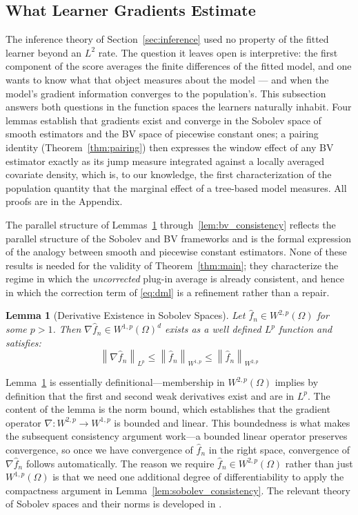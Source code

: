 \documentclass[12pt]{article}
\newtheorem{lemma}{Lemma}
\newcommand{\norm}[1]{\left\| #1 \right\|}
\newcommand{\Wonep}{W^{1,p}(\Omega)}
\newcommand{\Wtwop}{W^{2,p}(\Omega)}
\newcommand{\fn}{\hat{f}_n}
\begin{document}
	\subsection{What Learner Gradients Estimate}
	\label{sec:interpretation}
	
	The inference theory of Section~\ref{sec:inference} used no property of the fitted
	learner beyond an $L^2$ rate. The question it leaves open is interpretive: the
	first component of the score averages the finite differences of the fitted model,
	and one wants to know what that object measures about the model --- and when the
	model's gradient information converges to the population's. This subsection answers
	both questions in the function spaces the learners naturally inhabit. Four lemmas
	establish that gradients exist and converge in the Sobolev space of smooth
	estimators and the BV space of piecewise constant ones; a pairing identity
	(Theorem~\ref{thm:pairing}) then expresses the window effect of any BV estimator
	exactly as its jump measure integrated against a locally averaged covariate
	density, which is, to our knowledge, the first characterization of the population
	quantity that the marginal effect of a tree-based model measures. All proofs are in
	the Appendix.
	
	The parallel structure of Lemmas~\ref{lem:sobolev_existence}
	through~\ref{lem:bv_consistency} reflects the parallel structure of the Sobolev
	and BV frameworks and is the formal expression of the analogy between smooth and
	piecewise constant estimators. None of these results is needed for the validity of
	Theorem~\ref{thm:main}; they characterize the regime in which the \emph{uncorrected}
	plug-in average is already consistent, and hence in which the correction term of
	\eqref{eq:dml} is a refinement rather than a repair.
	
	\begin{lemma}[Derivative Existence in Sobolev Spaces]
		\label{lem:sobolev_existence}
		Let $\fn \in \Wtwop$ for some $p > 1$. Then $\nabla \fn \in W^{1,p}(\Omega)^d$
		exists as a well defined $L^p$ function and satisfies:
		\begin{equation}
			\norm{\nabla \fn}_{L^p} \leq \norm{\fn}_{W^{1,p}} \leq \norm{\fn}_{W^{2,p}}
		\end{equation}
	\end{lemma}
	
	Lemma~\ref{lem:sobolev_existence} is essentially definitional---membership in
	$\Wtwop$ implies by definition that the first and second weak derivatives exist and
	are in $L^p$. The content of the lemma is the norm bound, which establishes that
	the gradient operator $\nabla: W^{2,p} \to W^{1,p}$ is bounded and linear. This
	boundedness is what makes the subsequent consistency argument work---a bounded linear
	operator preserves convergence, so once we have convergence of $\fn$ in the right
	space, convergence of $\nabla \fn$ follows automatically. The reason we require
	$\fn \in \Wtwop$ rather than just $\Wonep$ is that we need one additional degree of
	differentiability to apply the compactness argument in
	Lemma~\ref{lem:sobolev_consistency}. The relevant theory of Sobolev spaces and their
	norms is developed in \citet[Chapter~5]{evans2010pde}.
	
\end{document}
